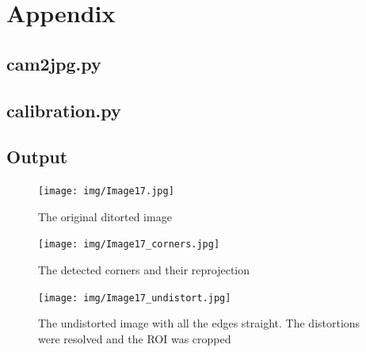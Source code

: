 \documentclass{scrartcl}
\begin{document}
\section{Appendix}


\subsection{cam2jpg.py}



\subsection{calibration.py}



\subsection{Output}
\begin{figure}[H]
\centering
 \texttt{[image: img/Image17.jpg]}
  \caption{The original ditorted image}
\caption{}
\label{fig:}
\end{figure}

\begin{figure}[H]
\centering
  \texttt{[image: img/Image17\_corners.jpg]}
  \caption{The detected corners and their reprojection}
\caption{}
\label{fig:}
\end{figure}

\begin{figure}[H]
\centering
  \texttt{[image: img/Image17\_undistort.jpg]}
  \caption{The undistorted image with all the edges straight. The distortions were resolved and the ROI was cropped}
\caption{}
\label{fig:}
\end{figure}









%


\end{document}
